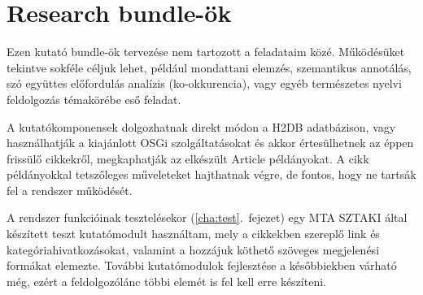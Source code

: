 
\section{Research bundle-ök}

Ezen kutató bundle-ök tervezése nem tartozott a feladataim közé. Működésüket tekintve sokféle céljuk lehet, például mondattani elemzés, szemantikus annotálás, szó együttes előfordulás analízis (ko-okkurencia), vagy egyéb természetes nyelvi feldolgozás témakörébe eső feladat.

A kutatókomponensek dolgozhatnak direkt módon a H2DB adatbázison, vagy használhatják a kiajánlott OSGi szolgáltatásokat és akkor értesülhetnek az éppen frissülő cikkekről, megkaphatják az elkészült Article példányokat. A cikk példányokkal tetszőleges műveleteket hajthatnak végre, de fontos, hogy ne tartsák fel a rendszer működését.

A rendszer funkcióinak tesztelésekor (\ref{cha:test}.~fejezet) egy MTA SZTAKI által készített teszt kutatómodult használtam, mely a cikkekben szereplő link és kategóriahivatkozásokat, valamint a hozzájuk köthető szöveges megjelenési formákat elemezte. További kutatómodulok fejlesztése a későbbiekben várható még, ezért a feldolgozólánc többi elemét is fel kell erre készíteni.

\label{sec:researchbundle}


